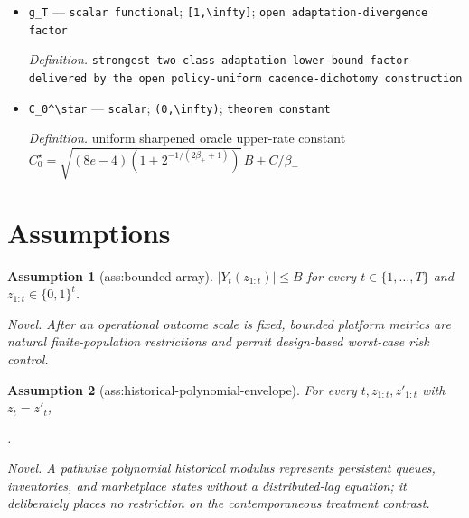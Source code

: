 \documentclass{article}
\newtheorem{assumption}{Assumption}
\begin{document}
\begin{itemize}
  \item \texttt{g\_\allowbreak{}T} --- \texttt{scalar functional}; \texttt{[1,\allowbreak{}\textbackslash{}\allowbreak{}infty]}; \texttt{open adaptation-\allowbreak{}divergence factor}
  \par\smallskip\noindent\emph{Definition.} \texttt{strongest two-\allowbreak{}class adaptation lower-\allowbreak{}bound factor delivered by the open policy-\allowbreak{}uniform cadence-\allowbreak{}dichotomy construction}
  \item \texttt{C\_\allowbreak{}0\textasciicircum{}\textbackslash{}\allowbreak{}star} --- \texttt{scalar}; \texttt{(0,\allowbreak{}\textbackslash{}\allowbreak{}infty)}; \texttt{theorem constant}
  \par\smallskip\noindent\emph{Definition.} uniform sharpened oracle upper-rate constant \(C_0^\star=\sqrt{(8e-4)(1+2^{-1/(2\beta_++1)})}\,B+C/\beta_-\)
\end{itemize}

\section{Assumptions}

\begin{assumption}[ass:bounded-array]\label{ass:bounded-array}
\(\lvert Y_t(z_{1:t})\rvert\le B\) for every \(t\in\{1,\ldots,T\}\) and \(z_{1:t}\in\{0,1\}^t\).
\par\smallskip\noindent\emph{Novel.} After an operational outcome scale is fixed, bounded platform metrics are natural finite-population restrictions and permit design-based worst-case risk control.
\end{assumption}

\begin{assumption}[ass:historical-polynomial-envelope]\label{ass:historical-polynomial-envelope}
For every \(t,z_{1:t},z'_{1:t}\) with \(z_t=z'_t\), \leavevmode\par\noindent {}\par\noindent.
\par\smallskip\noindent\emph{Novel.} A pathwise polynomial historical modulus represents persistent queues, inventories, and marketplace states without a distributed-lag equation; it deliberately places no restriction on the contemporaneous treatment contrast.
\end{assumption}
\end{document}
